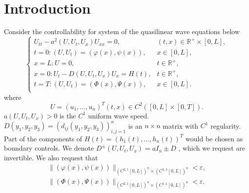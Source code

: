 \documentclass[a4paper,reqno,11pt]{amsart}
\numberwithin{equation}{section} %
\begin{document}
\maketitle



\section{Introduction}\label{intro sec}
Consider the controllability for system of the quasilinear wave equations below
\begin{equation}\label{42}
    \begin{cases}
	U_{tt}-a^2\left( U,U_t,U_x \right) U_{xx}=0,&		\left( t,x \right) \in \mathbb{R}^+\times \left[ 0,L \right] ,\\
	t=0:\left( U,U_t \right) =\left( \varphi  \left( x \right) ,\psi \left( x \right) \right) ,&		x\in \left[ 0,L \right] ,\\
	x=L:U=0,&		t\in \mathbb{R}^+,\\
	x=0:U_t-D\left( U,U_t,U_x \right) U_x=H\left( t \right) ,&		t\in \mathbb{R}^+,\\
	t=T:\left( U,U_t \right) =\left( \varPhi   \left( x \right) ,\varPsi  \left( x \right) \right) ,&		x\in \left[ 0,L \right] .\\
\end{cases}
\end{equation}
where
$$
U=\left(u_1, \ldots, u_n\right)^T(t, x) \in C^2([0,L]\times [0,T]) .
$$
$a\left(U, U_t, U_x\right)>0$ is the $C^1$ uniform wave speed. $D\left(y_1, y_2, y_3\right)=\left(d_{i j}\left(y_1, y_2, y_3\right)\right)_{i, j=1}^n$ is an   $n \times n$ matrix with $C^1$ regularity. Part of the components of $H(t)=\left(h_1(t), \ldots, h_n(t)\right)^T$ would be chosen as boundary controls. We denote $D^{\pm}\left( U,U_t,U_x \right) =a I_n \pm D $ , which we request are invertible. We also request that
$$
\begin{aligned}
	\lVert \left( \varphi  \left( x \right) ,\psi \left( x \right) \right) \rVert _{\left( C^{2,1}\left[ 0,L \right] \right) ^n\times \left( C^{1,1}\left[ 0,L \right] \right) ^n}  < \varepsilon ,\\
	\lVert \left( \varPhi   \left( x \right) ,\varPsi \left( x \right) \right) \rVert _{\left( C^{2,1}\left[ 0,L \right] \right) ^n\times \left( C^{1,1}\left[ 0,L \right] \right) ^n}  < \varepsilon .\\
\end{aligned}
$$
\end{document}
